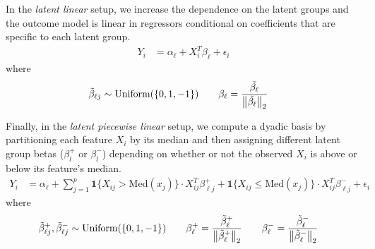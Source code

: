 \documentclass{article}
\theoremstyle{plain}
\theoremstyle{definition}
\theoremstyle{remark}
\begin{document}
In the \emph{latent linear} setup, we increase the dependence on the latent groups and the outcome model is linear in regressors conditional on coefficients that are specific to each latent group.
\begin{align}
Y_{i} &= \alpha_{\ell} + X_{i}^{T}\beta_{\ell} + \epsilon_{i} \label{eq:latent_outcome}
\end{align}
where
\begin{align}
\tilde{\beta}_{\ell j} &\sim \text{Uniform}(\{0, 1, -1\}) \qquad \beta_{\ell} = \frac{\tilde{\beta_{\ell}}}{\left\lVert\tilde{\beta_{\ell}}\right\rVert_{2}} \label{eq:latentslopes}
\end{align}

Finally, in the \emph{latent piecewise linear} setup, we compute a dyadic basis by partitioning each feature $X_i$ by its median and then assigning different latent group betas ($\beta^+_l$ or $\beta^-_l$) depending on whether or not the observed $X_i$ is above or below its feature's median.
\begin{align}
Y_{i} &= \alpha_{\ell} + \sum_{j=1}^p \textbf{1}\{X_{ij} > \text{Med}(x_j)\} \cdot X_{ij}^T \beta_{\ell j}^{+}  + \textbf{1}\{X_{ij} \leq \text{Med}(x_j)\} \cdot X_{ij}^T \beta_{\ell j}^{-} + \epsilon_{i} \label{eq:nonlinear_outcome}
\end{align}
where
\begin{align}
\tilde{\beta}^+_{\ell j}, \tilde{\beta}^-_{\ell j} &\sim \text{Uniform}(\{0, 1, -1\}) \qquad \beta^{+}_{\ell} = \frac{\tilde{\beta}^{+}_{\ell}}{\left\lVert\tilde{\beta}^{+}_{\ell}\right\rVert_{2}} \qquad \beta^{-}_{\ell} = \frac{\tilde{\beta}^{-}_{\ell}}{\left\lVert\tilde{\beta}^{-}_{\ell}\right\rVert_{2}} \label{eq:nonlinearslopes}
\end{align}


\end{document}
